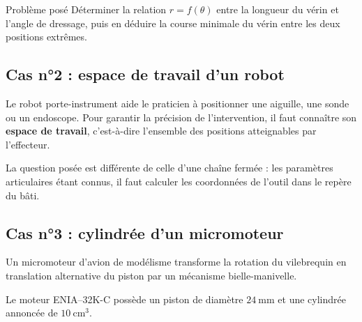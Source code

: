 \begin{center}
\begin{minipage}[c]{.44\linewidth}
\end{minipage}\hfill
\begin{minipage}[c]{.52\linewidth}
\TLEPASGeometry
\end{minipage}
\end{center}

\begin{TLThreeApp}{Problème posé}
Déterminer la relation $r=f(\theta)$ entre la longueur du vérin et
l'angle de dressage, puis en déduire la course minimale du vérin entre
les deux positions extrêmes.
\end{TLThreeApp}

\subsection{Cas n°2 : espace de travail d'un robot}

Le robot porte-instrument aide le praticien à positionner une aiguille,
une sonde ou un endoscope. Pour garantir la précision de l'intervention,
il faut connaître son \textbf{espace de travail}, c'est-à-dire l'ensemble
des positions atteignables par l'effecteur.

\begin{center}
\hfill
{}
\end{center}

La question posée est différente de celle d'une chaîne fermée : les
paramètres articulaires étant connus, il faut calculer les coordonnées
de l'outil dans le repère du bâti.

\subsection{Cas n°3 : cylindrée d'un micromoteur}

Un micromoteur d'avion de modélisme transforme la rotation du vilebrequin
en translation alternative du piston par un mécanisme bielle-manivelle.

\begin{center}
\hfill
{}
\end{center}

\TLBielleManivelleGeometry

Le moteur ENIA--32K-C possède un piston de diamètre $24\ \mathrm{mm}$ et
une cylindrée annoncée de $10\ \mathrm{cm^3}$.

